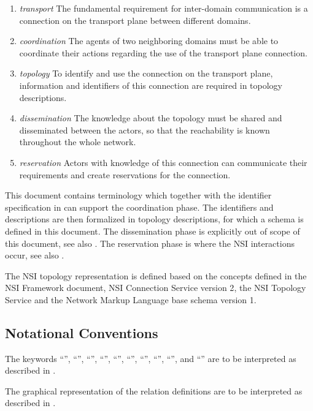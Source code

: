 \documentclass[12pt]{article}  %
\begin{document}
\begin{enumerate}
    \item \emph{transport} The fundamental requirement for inter-domain communication is a connection on the transport plane between different domains.
    \item \emph{coordination} The agents of two neighboring domains must be able to coordinate their actions regarding the use of the transport plane connection.
    \item \emph{topology} To identify and use the connection on the transport plane, information and identifiers of this connection are required in topology descriptions.
    \item \emph{dissemination} The knowledge about the topology must be shared and disseminated between the actors, so that the reachability is known throughout the whole network.
    \item \emph{reservation} Actors with knowledge of this connection can communicate their requirements and create reservations for the connection.
\end{enumerate}

This document contains terminology which together with the identifier specification in \cite{GFD.202} can support the coordination phase. The identifiers and descriptions are then formalized in topology descriptions, for which a schema is defined in this document. The dissemination phase is explicitly out of scope of this document, see also \cite{gfd-nsi-topo-serv}. The reservation phase is where the NSI interactions occur, see also \cite{GFD.173}.


The NSI topology representation is defined based on the concepts defined in the NSI Framework document\cite{GFD.173}, NSI Connection Service version 2\cite{gfd-nsi-connection}, the NSI Topology Service\cite{gfd-nsi-topo-serv} and the Network Markup Language base schema version 1\cite{GFD.206}.

\subsection{Notational Conventions}%
\label{sec:rfc2119}

The keywords “\MUST{}”, “\MUSTNOT{}”, “\REQUIRED{}”, “\SHALL{}”, “\SHALLNOT{}”, 
“\SHOULD{}”, “\SHOULDNOT{}”, “\RECOMMENDED{}”, “\MAY{}”,  and “\OPTIONAL{}” are 
to be interpreted as described in \cite{rfc2119}.

The graphical representation of the relation definitions are to be interpreted as described in \cite{GFD.206}.
\end{document}
